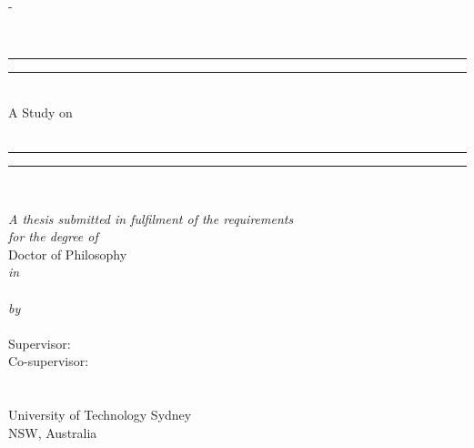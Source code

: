 \begin{titlingpage}
\begin{SingleSpace}

\calccentering{\unitlength} 
\begin{adjustwidth*}{\unitlength}{-\unitlength}
\begin{center}

~\\

\rule[0.5ex]{\linewidth}{2pt}\vspace*{-\baselineskip}\vspace*{3.2pt}
\rule[0.5ex]{\linewidth}{1pt}\\%
\noindent
{\LARGE{A Study on} \\[.25cm]}
{\HUGE{\utstitle}} \\[1.5mm] %

\rule[0.5ex]{\linewidth}{1pt}\vspace*{-\baselineskip}\vspace{4pt}
\rule[0.5ex]{\linewidth}{2pt}\\
\vspace {15mm}

\emph{\large A thesis submitted in fulfilment of the requirements}\\
\vspace {0.1in}
\emph{\large for the degree of}\\
\vspace {10mm}
{\large Doctor of Philosophy}\\
\vspace{2mm}
\emph{in}\\
\vspace{1mm}
{\large \utsfield}\\
\vspace {10mm}
\emph{\large by}\\
\vspace{4mm}
{\bfseries \Large \utsname} \\ %

\vspace {10mm}
{\large Supervisor: \utssupervisor}\\
{\large Co-supervisor: \utscosupervisor}\\

\vspace {10mm}
{\large \utsschool\\
\vspace {1mm}
\large \utsfaculty \\
\vspace {2mm}
{\Large University of Technology Sydney}\\
\vspace {1mm}
{NSW, Australia}
}\\
\vspace{23mm}




\end{center}
\end{adjustwidth*}
\end{SingleSpace}
\end{titlingpage}
